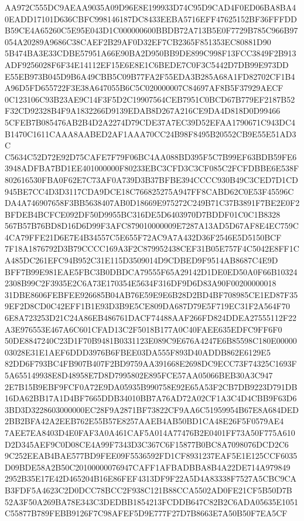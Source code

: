 \documentclass[UTF8,fontset=fandol,zihao=-4,a4paper]{ctexart}
\begin{document}
{{AA972C555DC9AEAA9035A09D96E8E199933D74C95D9CAD4F0ED06BA8BA40EADD17101D636CBFC998146187DC8433EEBA5716EFF47625152BF36FFFDD
B59CE4A65260C5E95E043D1C000000600BBDB72A713B5E0F7729B785C966B97054A20289A9686C38CAEF2B29AF0D32EF7CB2365F851353EC80881D90
5B474BA3E33CDBE57951A66E90BA2D950BB9DE899C998F13FCC3849F2B913ADF9256028F6F34E14112EF15E6E8E1C6BEDE7C0F3C5442D7DB99E973DD
E55EB973B045D9B6A49CBB5C09B77FA2F55EDA3B285A68A1FD82702CF1B4A96D5FD655722F3E38A647055B6C5C020000007C84697AF8B5F37929AECF
0C123106C93B23AE9C14F3F5D2C19907564CEB7951C0BCD67B779EF2187B52F32CD92328B4F9A1832266D9139EDAB8D267A216CE9DA4D818D0D99466
5CFEB7B085476AB2B4D2A2274D79CDE37A7EC39D52EFAA1790671C943DC4B1470C1611CAAA8AABED2AF1AAA70CC24B98F8495B20552CB9E55E51AD3C
C5634C52D72E92D75CAFE7F79F06BC4AA088BD395F5C7B99EF63BDB59FE63948ADFBA7BD1EE401000000F80233EBC3CFD3C3CF085C2FCFDBBE6E538F
802616530FBA0F62E7C73AF0A739D3B37BFBE394CCCC930B49C3CED7D1CD945BE7CC4D3D3117CDA9DCE18C766825275A947FF8CABD62C0E53F45596C
DA4A746907658F3BB5638407AB0D18669E975272C249B71C37B3891F7BE2E0F2BFDEB4BCFCE092DF50D9955BC316DE5D6403970D7BDDF01C0C1B8328
567B57B76BD8D16D6D99F3AFC879010000009E7287A13AD5D67AF8E4EC759C4CA79FFE21D6E7E4B34557C5E655F72AC9A7A432D36F2546E5D5150BCF
7F18A1876792D3B79CCCC169A3F2C879952438CEF31B05E757F4C5042E8FF1CA485DC261EFC94B952C31E115D3509014D9CDBED9F9514AB8687C4E9D
BFF7B99E981EAE5FBC3B0DBDCA79555F65A29142D1DE0ED50A0F66B103242308B99C2F3935E2C6A73E170354E5634F316DF9D6D83A90F00200000018
31DBE8606FEBFEE926685B04AB76E59E9E6B28D2BD4BF708985CE1ED87F359EF2D8CD0C42EFF1B1E93D3B9E5CE809DA687D79E5F719EC31F2A564F70
6E8A723253D21C24A86EB486761DACF74488AAF266FD824DDEA27555112F22A3E976553E467A6C601CFAD13C2F5018B177A0C40FAEE635EDFC9FF6F0
50DE8847240C23D1F70B9481B0331123E089C9E676A4247E6B85598C180E0000003028E31E1AEF6DDD3976B6FBEE03DA555F893D40ADDB862E6129E5
82DD6F793BC4FB907B407F2BD9759AA391668E2698DC9ECC73F74325C1693F5A655149938E8D48958E7D8D7995802E895FCE57AA05066BEB30A3C947
2E7B15B9EBF9FCF0A72E9DA05935B990758E92E65A53F2CB7DB9223D791DB16DA62BB17A1D4BF7665DDB34010BB7A76AD72A02CF1A3C4D4CBB9F63D6
3BD3D3228603000000EC28F9A2871BF73822CF9AA6C51959954B67E8A684DED2BB2BFA42A2EEB762E55B57E8257AAEB4AB50BD1CA48E26F5F0579AE4
7AEE7EA8403D4E0FAF3A0A461CAF5A014A77476B2E0401FF73A50F775A610D2D345AEF9C0D08CE4A99F7343D3C367C6F15877B0BC8A7098076DCD2C6
9C252EEAB4BAE577BD9FEE09F5536592FD1CF8931237EAF5E1E125CCF6035D09BDE58A2B50C20100000076947CAFF1AFBADBBA8B4A22DE714A979849
2952B35E17E42D465204B16E86FEF4313DF9F22A5D4A83338F7527A5CBC9CAB3FDF5A4623C2D0DCC78BCC2F938C121B88CCA5502AD0FE21CF5B50D7B
52A3F50A269BA78E343C3DEDBB1854213FCDDB647C82B2C6ADA05635E1051C55877B789FEBB9126F7C98AFEF5D9E777F27D7B8663E7A50B50F7EA5CF
}}
\end{document}
